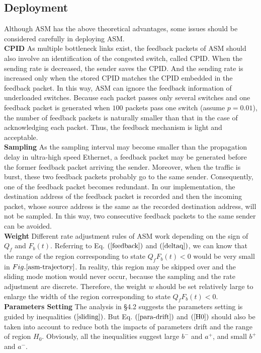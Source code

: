 \documentclass{sig-alternate-10pt}
\def\figurename{Fig.}
\begin{document}
\subsection{Deployment}
Although ASM has the above theoretical advantages, some issues should be considered carefully in deploying ASM. \\
\textbf{CPID}
As multiple bottleneck links exist, the feedback packets of ASM should also involve an identification of the congested switch, called CPID. When the sending rate is decreased, the sender saves the CPID. And the sending rate is increased only when the stored CPID matches the CPID embedded in the feedback packet. In this way, ASM can ignore the feedback information of underloaded switches. Because each packet passes only several switches and one feedback packet is generated when $100$ packets pass one switch (assume $p=0.01$), the number of feedback packets is naturally smaller than that in the case of acknowledging each packet. Thus, the feedback mechanism is light and acceptable.\\
\textbf{Sampling}
As the sampling interval may become smaller than the propagation delay in ultra-high speed Ethernet, a feedback packet may be generated before the former feedback packet arriving the sender. Moreover, when the traffic is burst, these two feedback packets probably go to the same sender. Consequently, one of the feedback packet becomes redundant. In our implementation, the destination address of the feedback packet is recorded and then the incoming packet, whose source address is the same as the recorded destination address, will not be sampled. In this way, two consecutive feedback packets to the same sender can be avoided. \\
\textbf{Weight}
Different rate adjustment rules of ASM work depending on the sign of $Q_f$ and $F_b(t)$. Referring to Eq. $(\ref{feedback})$ and $(\ref{deltaq})$, we can know that the range of the region corresponding to state $Q_fF_b(t)<0$ would be very small in $\figurename{\ref{asm-trajectory}}$. In reality, this region may be skipped over and the sliding mode motion would never occur, because the sampling and the rate adjustment are discrete. Therefore, the weight $w$ should be set relatively large to enlarge the width of the region corresponding to state $Q_fF_b(t)<0$.\\
\textbf{Parameters Setting} The analysis in \S4.2 suggests the parameters setting is guided by inequalities $(\ref{sliding})$. But Eq. $(\ref{para-drift})$ and $(\ref{H0})$ should also be taken into account to reduce both the impacts of parameters drift and the range of region $H_0$. Obviously, all the inequalities suggest large $b^-$ and $a^+$, and small $b^+$ and $a^-$.
\end{document}
